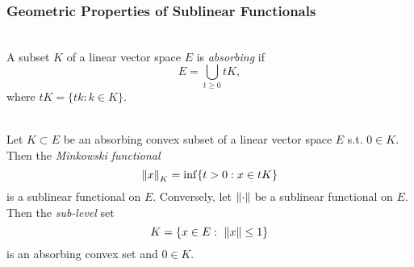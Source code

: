 \subsubsection{Geometric Properties of Sublinear Functionals}
\begin{definition}\ \\
    A subset $K$ of a linear vector space $E$ is \textit{absorbing} if
    \begin{equation*}
        E = \bigcup_{t \geq 0} t K,
    \end{equation*}
    where $tK = \{tk: k \in K\}$.
\end{definition}

\begin{proposition}\ \\
Let $K \subset E$ be an absorbing convex subset of a linear vector space $E$ s.t. $0 \in K$. Then the \textit{Minkowski functional}
\begin{equation*}
    \norm{x}_K = \inf\{t > 0: x \in tK\}
\end{equation*}
is a sublinear functional on $E$. Conversely, let $\norm{\cdot}$ be a sublinear functional on $E$. Then the \textit{sub-level} set
\begin{equation*}
    K = \{x \in E:\ \norm{x} \leq 1\}
\end{equation*}
is an absorbing convex set and $0 \in K$.
\end{proposition}
